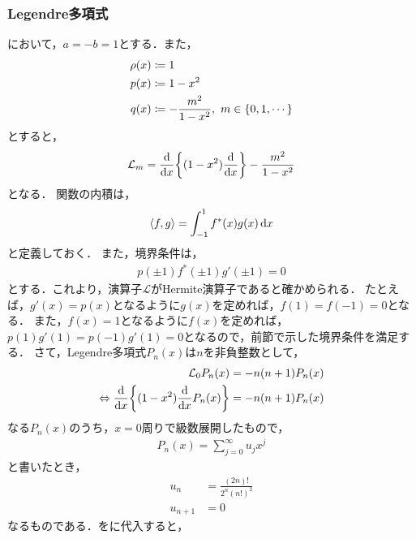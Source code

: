 \documentclass{report}
\begin{document}
    \subsubsection{Legendre多項式}
      において，$a = -b = 1$とする．また，
      \begin{align}
        \rho(x) &\coloneqq 1 \\ 
        p(x) &\coloneqq 1 - x^2 \\ 
        q(x) &\coloneqq -\frac{m^2}{1 - x^2},\ m\in \qty{0, 1, \cdots}
      \end{align}
      とすると，
      \begin{align}
        \mathcal{L}_m = \dv{x}\qty{(1 - x^2)\dv{x}} - \frac{m^2}{1 - x^2}
      \end{align}
      となる．
      関数の内積は，
      \begin{align}
        \left\langle f, g \right\rangle = \int_{-1}^{1} f^*(x)g(x) \dd{x} \label{inner-prod-legendre}
      \end{align}
      と定義しておく．
      また，境界条件は，
      \begin{align}
        p(\pm 1)f^*(\pm 1)g'(\pm 1) = 0
      \end{align}
      とする．これより，演算子$\mathcal{L}$がHermite演算子であると確かめられる．
      たとえば，$g'(x) = p(x)$となるように$g(x)$を定めれば，$f(1) = f(-1) = 0$となる．
      また，$f(x) = 1$となるように$f(x)$を定めれば，$p(1)g'(1) = p(-1)g'(1) = 0$となるので，前節で示した境界条件を満足する．
      さて，Legendre多項式$P_n(x)$は$n$を非負整数として，
      \begin{align}
        \mathcal{L}_0P_n(x) &= -n(n + 1) P_n(x) \\ 
        \Leftrightarrow \dv{x}\qty{(1 - x^2)\dv{x}P_n(x)} &= -n(n + 1)P_n(x)\label{legendre-polynominal} 
      \end{align}
      なる$P_n(x)$のうち，$x = 0$周りで級数展開したもので，
      \begin{align}
        P_n(x) = \sum_{j = 0}^{\infty}u_jx^j\label{legendre-polynominal-u-expantion}
      \end{align}
      と書いたとき，
      \begin{align}
        u_n &= \frac{(2n)!}{2^n(n!)^2}\label{legendre-polynominal-u-expantion-n} \\ 
        u_{n + 1} &= 0\label{legendre-polynominal-u-expantion-np1}
      \end{align}
      なるものである．をに代入すると，
\end{document}
